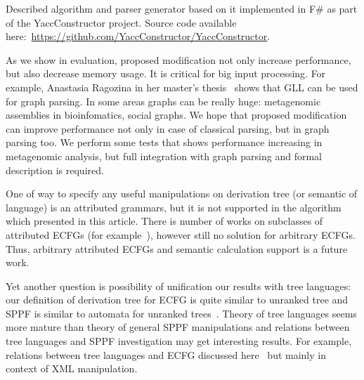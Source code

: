 \documentclass[runningheads,a4paper]{llncs}
\begin{document}
Described algorithm and parser generator based on it implemented in F\# as part of the YaccConstructor project.
Source code available here:~\url{https://github.com/YaccConstructor/YaccConstructor}.

As we show in evaluation, proposed modification not only increase performance, but also decrease memory usage. 
It is critical for big input processing.
For example, Anastasia Ragozina in her master's thesis~\cite{ragozina} shows that GLL can be used for graph parsing.  
In some areas graphs can be really huge: metagenomic assemblies in bioinfomatics, social graphs.
We hope that proposed modification can improve performance not only in case of classical parsing, but in graph parsing too. 
We perform some tests that shows performance increasing in metagenomic analysis, but full integration with graph parsing and formal description is required.

One of way to specify any useful manipulations on derivation tree (or semantic of language) is an attributed grammars, but it is not supported in the algorithm which presented in this article.
There is number of works on subclasses of attributed ECFGs (for example~\cite{AttributedELL}), however still no solution for arbitrary ECFGs.
Thus, arbitrary attributed ECFGs and semantic calculation support is a future work.

Yet another question is possibility of unification our results with tree languages: our definition of derivation tree for ECFG is quite similar to unranked tree and SPPF is similar to automata for unranked trees~\cite{TATA}.
Theory of tree languages seems more mature than theory of general SPPF manipulations and relations between tree languages and SPPF investigation may get interesting results. For example, relations between tree languages and ECFG discussed here~\cite{TreeLangAndECFG} but mainly in context of XML manipulation.





\end{document}
